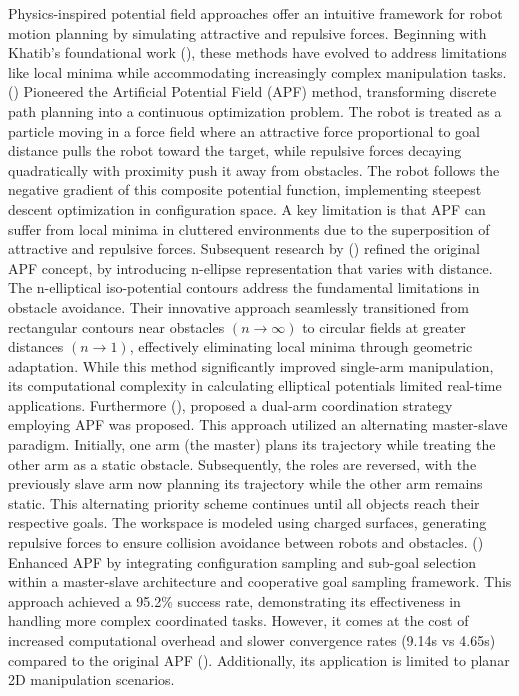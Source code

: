\documentclass[utf8]{FrontiersinHarvard}
\begin{document}
Physics-inspired potential field approaches offer an intuitive framework for robot motion planning by simulating attractive and repulsive forces. Beginning with Khatib's foundational work (\citet{khatib}), these methods have evolved to address limitations like local minima while accommodating increasingly complex manipulation tasks. (\citet{khatib}) Pioneered the Artificial Potential Field (APF) method, transforming discrete path planning into a continuous optimization problem. The robot is treated as a particle moving in a force field where an attractive force proportional to goal distance pulls the robot toward the target, while repulsive forces decaying quadratically with proximity push it away from obstacles. The robot follows the negative gradient of this composite potential function, implementing steepest descent optimization in configuration space. A key limitation is that APF can suffer from local minima in cluttered environments due to the superposition of attractive and repulsive forces. Subsequent research by (\citet{khosla1, khosla2, khosla3}) refined the original APF concept, by introducing n-ellipse representation that varies with distance. The n-elliptical iso-potential contours address the fundamental limitations in obstacle avoidance. Their innovative approach seamlessly transitioned from rectangular contours near obstacles $(n \to \infty)$ to circular fields at greater distances $(n \to 1)$, effectively eliminating local minima through geometric adaptation. While this method significantly improved single-arm manipulation, its computational complexity in calculating elliptical potentials limited real-time applications. Furthermore (\citet{priority}), proposed a dual-arm coordination strategy employing APF was proposed. This approach utilized an alternating master-slave paradigm. Initially, one arm (the master) plans its trajectory while treating the other arm as a static obstacle. Subsequently, the roles are reversed, with the previously slave arm now planning its trajectory while the other arm remains static. This alternating priority scheme continues until all objects reach their respective goals. The workspace is modeled using charged surfaces, generating repulsive forces to ensure collision avoidance between robots and obstacles. (\citet{Naeem, Naeem1}) Enhanced APF by integrating configuration sampling and sub-goal selection within a master-slave architecture and cooperative goal sampling framework. This approach achieved a 95.2\% success rate, demonstrating its effectiveness in handling more complex coordinated tasks. However, it comes at the cost of increased computational overhead and slower convergence rates (9.14s vs 4.65s) compared to the original APF (\citet{khatib}). Additionally, its application is limited to planar 2D manipulation scenarios.
\end{document}

